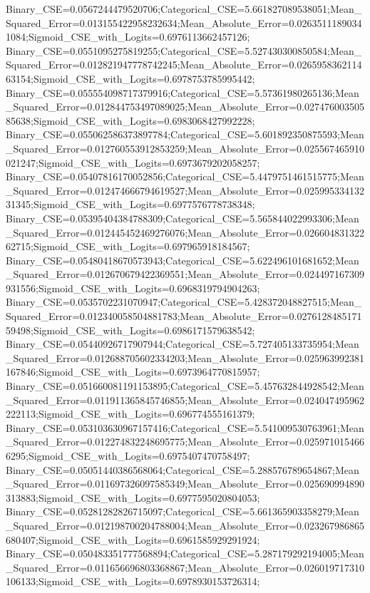 Binary_CSE=0.0567244479520706;Categorical_CSE=5.661827089538051;Mean_Squared_Error=0.013155422958232634;Mean_Absolute_Error=0.02635111890341084;Sigmoid_CSE_with_Logits=0.6976113662457126;
Binary_CSE=0.0551095275819255;Categorical_CSE=5.527430300850584;Mean_Squared_Error=0.012821947778742245;Mean_Absolute_Error=0.026595836211463154;Sigmoid_CSE_with_Logits=0.6978753785995442;
Binary_CSE=0.055554098717379916;Categorical_CSE=5.57361980265136;Mean_Squared_Error=0.012844753497089025;Mean_Absolute_Error=0.02747600350585638;Sigmoid_CSE_with_Logits=0.6983068427992228;
Binary_CSE=0.055062586373897784;Categorical_CSE=5.601892350875593;Mean_Squared_Error=0.012760553912853259;Mean_Absolute_Error=0.025567465910021247;Sigmoid_CSE_with_Logits=0.6973679202058257;
Binary_CSE=0.05407816170052856;Categorical_CSE=5.4479751461515775;Mean_Squared_Error=0.012474666794619527;Mean_Absolute_Error=0.02599533413231345;Sigmoid_CSE_with_Logits=0.6977576778738348;
Binary_CSE=0.05395404384788309;Categorical_CSE=5.565844022993306;Mean_Squared_Error=0.012445452469276076;Mean_Absolute_Error=0.02660483132262715;Sigmoid_CSE_with_Logits=0.697965918184567;
Binary_CSE=0.05480418670573943;Categorical_CSE=5.622496101681652;Mean_Squared_Error=0.012670679422369551;Mean_Absolute_Error=0.024497167309931556;Sigmoid_CSE_with_Logits=0.6968319794904263;
Binary_CSE=0.0535702231070947;Categorical_CSE=5.428372048827515;Mean_Squared_Error=0.012340058504881783;Mean_Absolute_Error=0.027612848517159498;Sigmoid_CSE_with_Logits=0.6986171579638542;
Binary_CSE=0.05440926717907944;Categorical_CSE=5.727405133735954;Mean_Squared_Error=0.012688705602334203;Mean_Absolute_Error=0.025963992381167846;Sigmoid_CSE_with_Logits=0.6973964770815957;
Binary_CSE=0.051660081191153895;Categorical_CSE=5.457632844928542;Mean_Squared_Error=0.011911365845746855;Mean_Absolute_Error=0.024047495962222113;Sigmoid_CSE_with_Logits=0.696774555161379;
Binary_CSE=0.053103630967157416;Categorical_CSE=5.541009530763961;Mean_Squared_Error=0.012274832248695775;Mean_Absolute_Error=0.0259710154666295;Sigmoid_CSE_with_Logits=0.6975407470758497;
Binary_CSE=0.05051440386568064;Categorical_CSE=5.288576789654867;Mean_Squared_Error=0.011697326097585349;Mean_Absolute_Error=0.025690994890313883;Sigmoid_CSE_with_Logits=0.6977595020804053;
Binary_CSE=0.05281282826715097;Categorical_CSE=5.661365903358279;Mean_Squared_Error=0.012198700204788004;Mean_Absolute_Error=0.023267986865680407;Sigmoid_CSE_with_Logits=0.6961585929291924;
Binary_CSE=0.050483351777568894;Categorical_CSE=5.287179292194005;Mean_Squared_Error=0.011656696803368867;Mean_Absolute_Error=0.026019717310106133;Sigmoid_CSE_with_Logits=0.6978930153726314;

